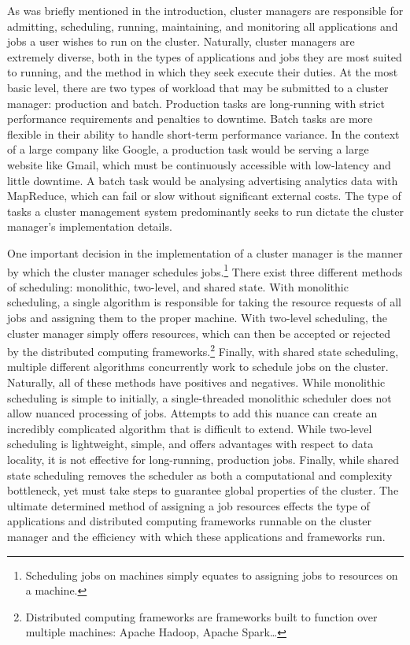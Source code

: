 \documentclass[twoside]{report}
\begin{document}
As was briefly mentioned in the introduction, cluster managers are responsible
for admitting, scheduling, running, maintaining, and monitoring all applications
and jobs a user wishes to run on the cluster. Naturally, cluster managers are
extremely diverse, both in the types of applications and jobs they are most
suited to running, and the method in which they seek execute their duties.
At the most basic level, there are two types of workload that may be submitted
to a cluster manager: production and batch. Production tasks are long-running
with strict performance requirements and penalties to downtime. Batch tasks are
more flexible in their ability to handle short-term performance variance. In the
context of a large company like Google, a production task would be serving a
large website like Gmail, which must be continuously accessible with low-latency
and little downtime. A batch task would be analysing advertising analytics data
with MapReduce, which can fail or slow without significant external
costs.\cite[pg. 1]{borg} The type of tasks a cluster management system
predominantly seeks to run dictate the cluster manager's implementation details.

One important decision in the implementation of a cluster manager is the manner
by which the cluster manager schedules jobs.\footnote{Scheduling jobs on
machines simply equates to assigning jobs to resources on a machine.}  There exist three
different methods of scheduling: monolithic, two-level, and
shared state. With monolithic scheduling, a single algorithm
is responsible for taking the resource requests of all jobs and assigning them
to the proper machine. With two-level scheduling, the cluster manager simply
offers resources, which can then be accepted or rejected by the distributed
computing frameworks.\footnote{Distributed computing frameworks are frameworks
built to function over multiple machines: Apache Hadoop, Apache Spark\dots}
Finally, with shared state scheduling, multiple different algorithms concurrently work to
schedule jobs on the cluster.\cite[pg. 1]{omega} Naturally, all
of these methods have positives and negatives. While monolithic scheduling is
simple to initially, a single-threaded monolithic scheduler does not allow
nuanced processing of jobs. Attempts to add this nuance can create an incredibly
complicated algorithm that is difficult to extend.\cite[pg. 353-354]{omega}
While two-level scheduling is lightweight, simple, and offers advantages with respect to
data locality, it is not effective for long-running,
production jobs. Finally, while shared state scheduling removes the scheduler as
both a computational and complexity bottleneck, yet must take steps to guarantee
global properties of the cluster.\cite[pg. 363]{omega}
The ultimate determined method of assigning a job
resources effects the type of applications and distributed computing frameworks
runnable on the cluster manager and the efficiency with which these applications
and frameworks run.
\end{document}
